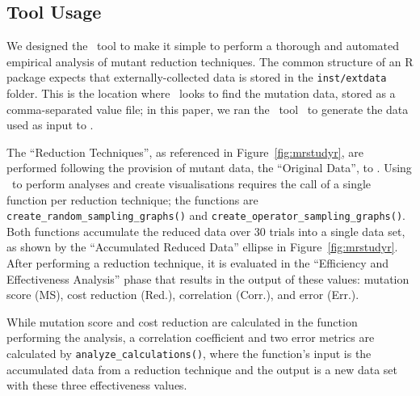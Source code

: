\subsection{Tool Usage}




We designed the \mr~tool to make it simple to perform a thorough and automated empirical analysis of mutant reduction
techniques. The common structure of an R package expects that externally-collected data is stored in the
\texttt{inst/extdata} folder. This is the location where \mr~looks to find the mutation data, stored as a
comma-separated value file; in this paper, we ran the \sa~tool~\cite{McMinn2016} to generate the data used as input
to \mr.




The ``Reduction Techniques'', as referenced in Figure~\ref{fig:mrstudyr}, are performed following the provision of
mutant data, the ``Original Data'', to \mr. Using \mr~to perform analyses and create visualisations requires the call of
a single function  per reduction technique; the functions are {\texttt{create\_random\_sampling\_graphs()}} and
{\texttt{create\_operator\_sampling\_graphs()}}. Both functions accumulate the reduced data over 30 trials into a single
data set, as shown by the ``Accumulated Reduced Data'' ellipse in Figure~\ref{fig:mrstudyr}.  After performing a
reduction technique, it is evaluated in the ``Efficiency and Effectiveness Analysis'' phase that results in the output
of these values: mutation score (MS), cost reduction (Red.), correlation (Corr.), and error (Err.).


While mutation score and cost reduction are calculated in the function performing the analysis, a correlation
coefficient and two error metrics are calculated by \texttt{analyze\_calculations()}, where the function's input is the
accumulated data from a reduction technique and the output is a new data set with these three effectiveness
values.

